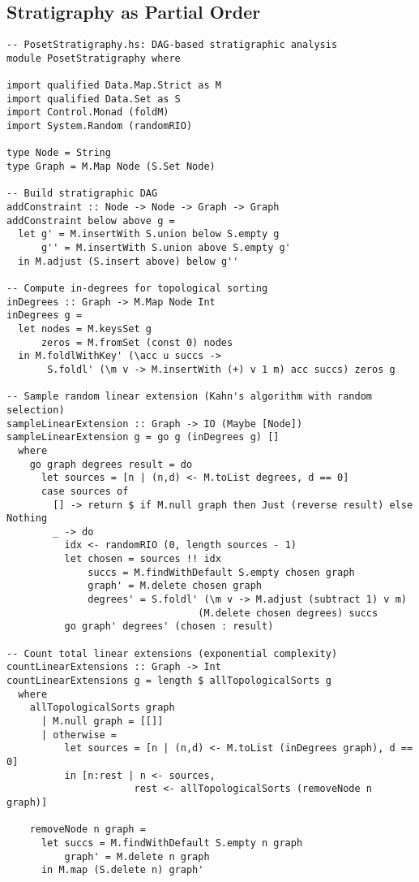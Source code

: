 \documentclass[11pt]{article}
\theoremstyle{definition}
\theoremstyle{plain}
\theoremstyle{remark}
\begin{document}
\subsection*{Stratigraphy as Partial Order}
\begin{lstlisting}
-- PosetStratigraphy.hs: DAG-based stratigraphic analysis
module PosetStratigraphy where

import qualified Data.Map.Strict as M
import qualified Data.Set as S
import Control.Monad (foldM)
import System.Random (randomRIO)

type Node = String
type Graph = M.Map Node (S.Set Node)

-- Build stratigraphic DAG
addConstraint :: Node -> Node -> Graph -> Graph  
addConstraint below above g =
  let g' = M.insertWith S.union below S.empty g
      g'' = M.insertWith S.union above S.empty g'
  in M.adjust (S.insert above) below g''

-- Compute in-degrees for topological sorting  
inDegrees :: Graph -> M.Map Node Int
inDegrees g = 
  let nodes = M.keysSet g
      zeros = M.fromSet (const 0) nodes
  in M.foldlWithKey' (\acc u succs -> 
       S.foldl' (\m v -> M.insertWith (+) v 1 m) acc succs) zeros g

-- Sample random linear extension (Kahn's algorithm with random selection)
sampleLinearExtension :: Graph -> IO (Maybe [Node])
sampleLinearExtension g = go g (inDegrees g) []
  where
    go graph degrees result = do
      let sources = [n | (n,d) <- M.toList degrees, d == 0]
      case sources of
        [] -> return $ if M.null graph then Just (reverse result) else Nothing
        _ -> do
          idx <- randomRIO (0, length sources - 1)
          let chosen = sources !! idx
              succs = M.findWithDefault S.empty chosen graph
              graph' = M.delete chosen graph
              degrees' = S.foldl' (\m v -> M.adjust (subtract 1) v m) 
                                 (M.delete chosen degrees) succs
          go graph' degrees' (chosen : result)

-- Count total linear extensions (exponential complexity)
countLinearExtensions :: Graph -> Int
countLinearExtensions g = length $ allTopologicalSorts g
  where
    allTopologicalSorts graph
      | M.null graph = [[]]
      | otherwise = 
          let sources = [n | (n,d) <- M.toList (inDegrees graph), d == 0]
          in [n:rest | n <- sources, 
                      rest <- allTopologicalSorts (removeNode n graph)]
    
    removeNode n graph = 
      let succs = M.findWithDefault S.empty n graph
          graph' = M.delete n graph
      in M.map (S.delete n) graph'
\end{lstlisting}
\end{document}
